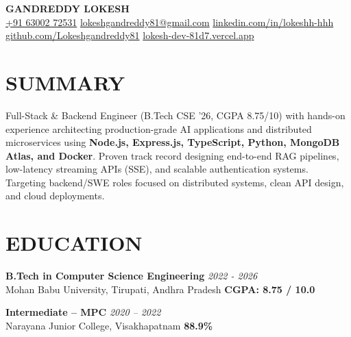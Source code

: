 \documentclass[a4paper,9.5pt]{article}
\begin{document}
\begin{center}
    {\LARGE \textbf{\color{headcolor}GANDREDDY LOKESH}} \\[4pt]
    \small
    \href{tel:+916300272531}{+91 63002 72531}
    \quad\textbar\quad
    \href{mailto:lokeshgandreddy81@gmail.com}{lokeshgandreddy81@gmail.com}
    \quad\textbar\quad
    \href{https://linkedin.com/in/lokeshh-hhh}{linkedin.com/in/lokeshh-hhh}
    \quad\textbar\quad
    \href{https://github.com/Lokeshgandreddy81}{github.com/Lokeshgandreddy81}
    \quad\textbar\quad
    \href{https://lokesh-dev-81d7.vercel.app}{lokesh-dev-81d7.vercel.app}
\end{center}

\section*{SUMMARY}
Full-Stack \& Backend Engineer (B.Tech CSE '26, CGPA 8.75/10) with hands-on experience architecting production-grade AI applications and distributed microservices using \textbf{Node.js, Express.js, TypeScript, Python, MongoDB Atlas, and Docker}. Proven track record designing end-to-end RAG pipelines, low-latency streaming APIs (SSE), and scalable authentication systems. Targeting backend/SWE roles focused on distributed systems, clean API design, and cloud deployments.

\section*{EDUCATION}
\textbf{B.Tech in Computer Science Engineering} \hfill \textit{2022 - 2026}\\
Mohan Babu University, Tirupati, Andhra Pradesh \hfill \textbf{CGPA: 8.75 / 10.0}

\smallskip
\noindent\textbf{Intermediate -- MPC} \hfill \textit{2020 -- 2022}\\
Narayana Junior College, Visakhapatnam \hfill \textbf{88.9\%}

\end{document}
